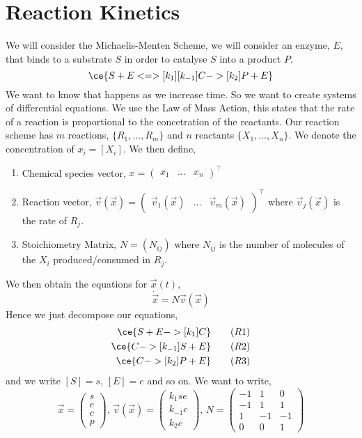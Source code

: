 \section{Reaction Kinetics}
We will consider the Michaelis-Menten Scheme, we will consider an enzyme, $E$, that binds to a substrate $S$ in order to catalyse $S$ into a product $P$.
$$ \ce{S + E <=>[k_1][k_{-1}] C ->[k_2] P + E} $$
We want to know that happens as we increase time. So we want to create systems of differential equations. We use the Law of Mass Action, this states that the rate of a reaction is proportional to the concetration of the reactants. Our reaction scheme has $m$ reactions, $\{R_1, \dots, R_m\}$ and $n$ reactants $\{X_1, \dots, X_n\}$. We denote the concentration of $x_i = [X_i]$. We then define,
\begin{enumerate}
  \item Chemical species vector, $x = \begin{pmatrix}
    x_1 & \dots & x_n
  \end{pmatrix}^\top$
  \item Reaction vector, $\vec v(\vec x) = \begin{pmatrix}
    \vec v_1(\vec x) & \dots & \vec v_m(\vec x)
  \end{pmatrix}^\top$ where $\vec v_j (\vec x)$ is the rate of $R_j$.
  \item Stoichiometry Matrix, $N = (N_{ij})$ where $N_{ij}$ is the number of molecules of the $X_i$ produced/consumed in $R_j$.
\end{enumerate}
We then obtain the equations for $\vec x(t)$,
$$ \dot{\vec x} = N\vec v(\vec x) $$
Hence we just decompose our equations,
\begin{align}
  \ce{S + E ->[k_1] C} \tag{$R1$} \\
  \ce{C ->[k_{-1}] S + E} \tag{$R2$} \\
  \ce{C ->[k_2] P + E} \tag{$R3$}
\end{align}
and we write $[S] = s$, $[E] = e$ and so on. We want to write,
$$ \vec x = \begin{pmatrix}
  s \\ e \\ c \\ p
\end{pmatrix},\, \vec v(\vec x) = \begin{pmatrix}
  k_1se \\ k_{-1}c \\ k_2c
\end{pmatrix},\, N = \begin{pmatrix}
  -1 & 1 & 0\\
  -1 & 1 & 1 \\
  1 & -1 & -1\\
  0 & 0 & 1
\end{pmatrix} $$
